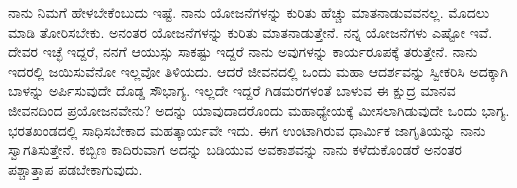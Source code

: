 ನಾನು ನಿಮಗೆ ಹೇಳಬೇಕೆಂಬುದು ಇಷ್ಟೆ. ನಾನು ಯೋಜನೆಗಳನ್ನು ಕುರಿತು ಹೆಚ್ಚು ಮಾತನಾಡುವವನಲ್ಲ. ಮೊದಲು ಮಾಡಿ ತೋರಿಸಬೇಕು. ಅನಂತರ ಯೋಜನೆಗಳನ್ನು ಕುರಿತು ಮಾತನಾಡುತ್ತೇನೆ. ನನ್ನ ಯೋಜನೆಗಳು ಎಷ್ಟೋ ಇವೆ. ದೇವರ ಇಚ್ಛೆ ಇದ್ದರೆ, ನನಗೆ ಆಯುಸ್ಸು ಸಾಕಷ್ಟು ಇದ್ದರೆ ನಾನು ಅವುಗಳನ್ನು ಕಾರ್ಯರೂಪಕ್ಕೆ ತರುತ್ತೇನೆ. ನಾನು ಇದರಲ್ಲಿ ಜಯಿಸುವೆನೋ ಇಲ್ಲವೋ ತಿಳಿಯದು. ಆದರೆ ಜೀವನದಲ್ಲಿ ಒಂದು ಮಹಾ ಆದರ್ಶವನ್ನು ಸ್ವೀಕರಿಸಿ ಅದಕ್ಕಾಗಿ ಬಾಳನ್ನು ಅರ್ಪಿಸುವುದೇ ದೊಡ್ಡ ಸೌಭಾಗ್ಯ. ಇಲ್ಲದೇ ಇದ್ದರೆ ಗಿಡಮರಗಳಂತೆ ಬಾಳುವ ಈ ಕ್ಷುದ್ರ ಮಾನವ ಜೀವನದಿಂದ ಪ್ರಯೋಜನವೇನು? ಅದನ್ನು ಯಾವುದಾದರೊಂದು ಮಹಾಧ್ಯೇಯಕ್ಕೆ ಮೀಸಲಾಗಿಡುವುದೇ ಒಂದು ಭಾಗ್ಯ. ಭರತಖಂಡದಲ್ಲಿ ಸಾಧಿಸಬೇಕಾದ ಮಹತ್ಕಾರ್ಯವೇ ಇದು. ಈಗ ಉಂಟಾಗಿರುವ ಧಾರ್ಮಿಕ ಜಾಗೃತಿಯನ್ನು ನಾನು ಸ್ವಾಗತಿಸುತ್ತೇನೆ. ಕಬ್ಬಿಣ ಕಾದಿರುವಾಗ ಅದನ್ನು ಬಡಿಯುವ ಅವಕಾಶವನ್ನು ನಾನು ಕಳೆದು\-ಕೊಂಡರೆ ಅನಂತರ ಪಶ್ಚಾತ್ತಾಪ ಪಡಬೇಕಾಗುವುದು.

